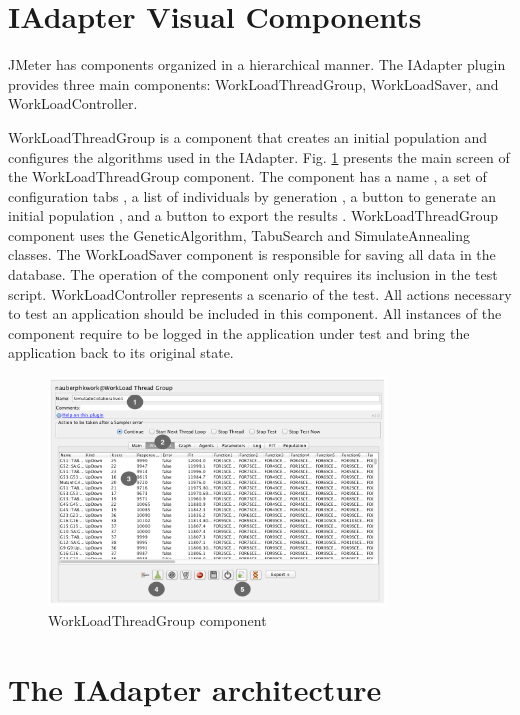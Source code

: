 \documentclass{report}
\begin{document}
\section{IAdapter Visual Components}

JMeter has components organized  in a hierarchical manner. The IAdapter plugin provides three main components: WorkLoadThreadGroup, WorkLoadSaver, and WorkLoadController.
 
WorkLoadThreadGroup is a component that creates an initial population and configures the algorithms used in the IAdapter. Fig. \ref{fig:tela1iadapter} presents the main screen of the WorkLoadThreadGroup component. The component has a name , a set of configuration tabs , a list of individuals by generation , a button to generate an initial population , and a button to export the results . WorkLoadThreadGroup component uses the GeneticAlgorithm, TabuSearch and SimulateAnnealing classes.  The WorkLoadSaver component is responsible for saving all data in the database. The operation of the component only requires its inclusion in the test script. WorkLoadController represents a scenario of the test. All actions necessary to test an application should be included in this component. All instances of the component require to be logged in the application under test and bring the application back to its original state.

\begin{figure}[h]
\centering
\includegraphics[width=0.8\textwidth]{./images/tela1iadapter.png}
\caption{WorkLoadThreadGroup component}
\label{fig:tela1iadapter}
\end{figure}

\vspace*{-.075in}
\section{The IAdapter architecture}
\label{sec:technique}
\vspace*{-.075in}
\end{document}
